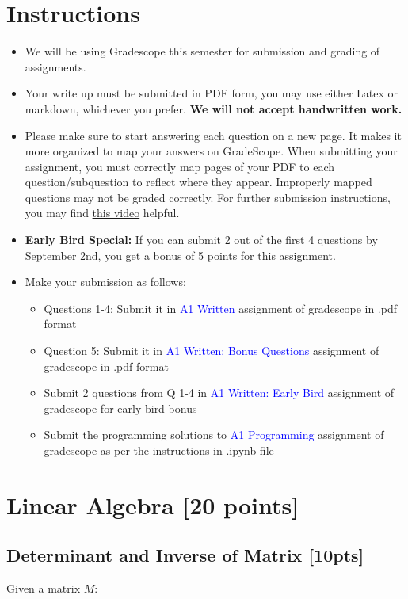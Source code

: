 \documentclass{article}
\begin{document}
\section*{Instructions}
\begin{itemize}
    \item We will be using Gradescope this semester for submission and grading of assignments. 
    \item Your write up must be submitted in PDF form, you may use either Latex or markdown, whichever you prefer. \textbf{We will not accept handwritten work.}
    \item Please make sure to start answering each question on a new page. It makes it more organized to map your answers on GradeScope. When submitting your assignment, you must correctly map pages of your PDF to each question/subquestion to reflect where they appear. Improperly mapped questions may not be graded correctly. For further submission instructions, you may find  \href{https://www.youtube.com/watch?v=KMPoby5g_nE&vl=en}{this video} helpful.
    \item \textbf{Early Bird Special:} If you can submit 2 out of the first 4 questions by September 2nd, you get a bonus of 5 points for this assignment.
    \item Make your submission as follows:
    \begin{itemize}
    \item Questions 1-4: Submit it in \textcolor{blue}{A1 Written} assignment of gradescope in .pdf format
    \item Question 5: Submit it in \textcolor{blue}{A1 Written: Bonus Questions} assignment of gradescope in .pdf format
    \item Submit 2 questions from Q 1-4 in \textcolor{blue}{A1 Written: Early Bird} assignment of gradescope for early bird bonus 
    \item Submit the programming solutions to \textcolor{blue}{A1 Programming} assignment of gradescope as per the instructions in .ipynb file
    \end{itemize}
\end{itemize}

\section{Linear Algebra [20 points]}

\subsection{Determinant and Inverse of Matrix [10pts]}
Given a matrix $M$:
\end{document}
